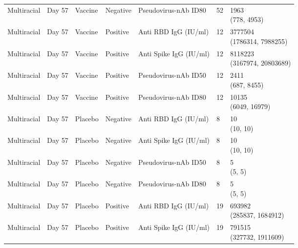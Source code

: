 \documentclass[]{book}
\theoremstyle{definition}
\theoremstyle{definition}
\theoremstyle{definition}
\newcommand{\1}{\mathbbm{1}}
\begin{document}
\begin{landscape}
\begin{ThreePartTable}
\begin{longtable}[t]{>{\raggedright\arraybackslash}p{7cm}llllll}
\hspace{1em}Multiracial & Day 57 & Vaccine & Negative & Pseudovirus-nAb ID80 & 52 & \makecell[l]{1963\\(778, 4953)}\\
\hspace{1em}Multiracial & Day 57 & Vaccine & Positive & Anti RBD IgG (IU/ml) & 12 & \makecell[l]{3777504\\(1786314, 7988255)}\\
\hspace{1em}Multiracial & Day 57 & Vaccine & Positive & Anti Spike IgG (IU/ml) & 12 & \makecell[l]{8118223\\(3167974, 20803689)}\\
\hspace{1em}Multiracial & Day 57 & Vaccine & Positive & Pseudovirus-nAb ID50 & 12 & \makecell[l]{2411\\(687, 8455)}\\
\hspace{1em}Multiracial & Day 57 & Vaccine & Positive & Pseudovirus-nAb ID80 & 12 & \makecell[l]{10135\\(6049, 16979)}\\
\hspace{1em}Multiracial & Day 57 & Placebo & Negative & Anti RBD IgG (IU/ml) & 8 & \makecell[l]{10\\(10, 10)}\\
\hspace{1em}Multiracial & Day 57 & Placebo & Negative & Anti Spike IgG (IU/ml) & 8 & \makecell[l]{10\\(10, 10)}\\
\hspace{1em}Multiracial & Day 57 & Placebo & Negative & Pseudovirus-nAb ID50 & 8 & \makecell[l]{5\\(5, 5)}\\
\hspace{1em}Multiracial & Day 57 & Placebo & Negative & Pseudovirus-nAb ID80 & 8 & \makecell[l]{5\\(5, 5)}\\
\hspace{1em}Multiracial & Day 57 & Placebo & Positive & Anti RBD IgG (IU/ml) & 19 & \makecell[l]{693982\\(285837, 1684912)}\\
\hspace{1em}Multiracial & Day 57 & Placebo & Positive & Anti Spike IgG (IU/ml) & 19 & \makecell[l]{791515\\(327732, 1911609)}\\

\end{longtable}
\end{ThreePartTable}
\end{landscape}
\end{document}
